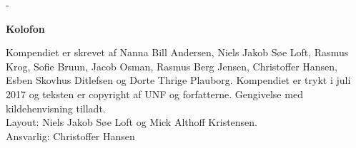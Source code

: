 \newpage


\begin{adjustwidth*}{\frontpagecorrection}{-\frontpagecorrection}
  \thispagestyle{empty}
  \strut
  \setlength{\parindent}{0pt}
  \addtolength{\parskip}{.6em}

  \vfill
    
  \begin{center}
    \bfseries Kolofon
  \end{center}
 
  \makeatletter
  \edef\fontandleading{\@memptsize.0/\the\baselineskip}
  \makeatother

  \small
   
  \textsl{\thesistitle}
    
  \smallskip
  
  Kompendiet er skrevet af Nanna Bill Andersen, Niels Jakob Søe Loft, Rasmus Krog, Sofie Bruun, Jacob Osman, Rasmus Berg Jensen, Christoffer Hansen, Esben Skovhus Ditlefsen og Dorte Thrige Plauborg. Kompendiet er trykt i juli 2017 og teksten
  er copyright
   af UNF og forfatterne. Gengivelse med kildehenvisning tilladt. \\
  Layout: Niels Jakob Søe Loft og Mick Althoff Kristensen.\\
  Ansvarlig: Christoffer Hansen
\end{adjustwidth*}



